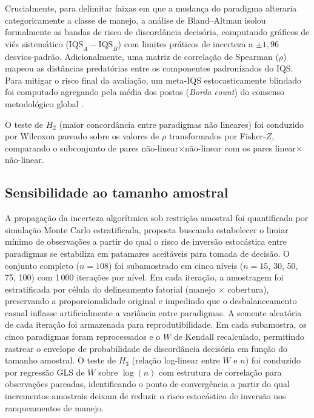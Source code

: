 \documentclass[pdflatex,sn-basic]{sn-jnl}%
\begin{document}
Crucialmente, para delimitar faixas em que a mudança do paradigma alteraria categoricamente a classe de manejo, a análise de Bland--Altman isolou formalmente as bandas de risco de discordância decisória, computando gráficos de viés sistemático ($\text{IQS}_A - \text{IQS}_B$) com limites práticos de incerteza a $\pm 1{,}96$ desvios-padrão. Adicionalmente, uma matriz de correlação de Spearman ($\rho$) mapeou as distâncias predatórias entre os componentes padronizados do IQS. Para mitigar o risco final da avaliação, um meta-IQS estocasticamente blindado foi computado agregando pela média dos postos (\textit{Borda count}) do consenso metodológico global \cite{Lin2010}.

O teste de $H_2$ (maior concordância entre paradigmas não lineares) foi conduzido por Wilcoxon pareado sobre os valores de $\rho$ transformados por Fisher-$Z$, comparando o subconjunto de pares não-linear$\times$não-linear com os pares linear$\times$não-linear.

\subsection{Sensibilidade ao tamanho amostral}\label{subsec:sensitivity}

A propagação da incerteza algorítmica sob restrição amostral foi quantificada por simulação Monte Carlo estratificada, proposta buscando estabelecer o limiar mínimo de observações a partir do qual o risco de inversão estocástica entre paradigmas se estabiliza em patamares aceitáveis para tomada de decisão. O conjunto completo ($n = 108$) foi subamostrado em cinco níveis ($n = 15$, 30, 50, 75, 100) com 1\,000 iterações por nível. Em cada iteração, a amostragem foi estratificada por célula do delineamento fatorial (manejo $\times$ cobertura), preservando a proporcionalidade original e impedindo que o desbalanceamento casual inflasse artificialmente a variância entre paradigmas. A semente aleatória de cada iteração foi armazenada para reprodutibilidade. Em cada subamostra, os cinco paradigmas foram reprocessados e o $W$ de Kendall recalculado, permitindo rastrear o envelope de probabilidade de discordância decisória em função do tamanho amostral. O teste de $H_3$ (relação log-linear entre $W$ e $n$) foi conduzido por regressão GLS de $\bar{W}$ sobre $\log(n)$ com estrutura de correlação para observações pareadas, identificando o ponto de convergência a partir do qual incrementos amostrais deixam de reduzir o risco estocástico de inversão nos ranqueamentos de manejo.
\end{document}
